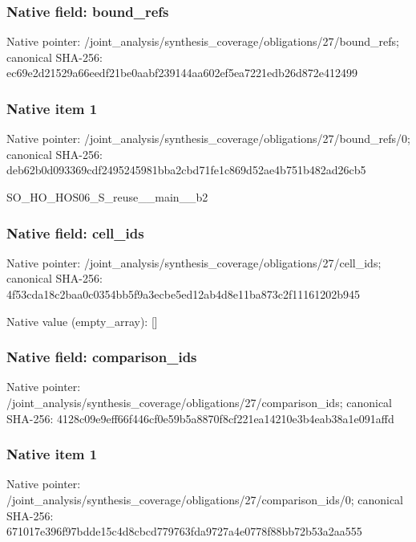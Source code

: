 \documentclass[10pt,a4paper]{article}
\begin{document}
\subsubsection{Native field: bound\_\allowbreak{}refs}
Native pointer: /joint\_\allowbreak{}analysis/synthesis\_\allowbreak{}coverage/obligations/27/bound\_\allowbreak{}refs; canonical SHA-256: ec69e2d21529a66eedf21be0aabf239144aa602ef5ea7221edb26d872e412499

\subsubsection{Native item 1}
Native pointer: /joint\_\allowbreak{}analysis/synthesis\_\allowbreak{}coverage/obligations/27/bound\_\allowbreak{}refs/0; canonical SHA-256: deb62b0d093369cdf2495245981bba2cbd71fe1c869d52ae4b751b482ad26cb5

\begingroup\raggedright\sloppy SO\_\allowbreak{}HO\_\allowbreak{}HOS06\_\allowbreak{}S\_\allowbreak{}reuse\_\allowbreak{}\_\allowbreak{}main\_\allowbreak{}\_\allowbreak{}b2\par\endgroup

\subsubsection{Native field: cell\_\allowbreak{}ids}
Native pointer: /joint\_\allowbreak{}analysis/synthesis\_\allowbreak{}coverage/obligations/27/cell\_\allowbreak{}ids; canonical SHA-256: 4f53cda18c2baa0c0354bb5f9a3ecbe5ed12ab4d8e11ba873c2f11161202b945

Native value (empty\_\allowbreak{}array): []

\subsubsection{Native field: comparison\_\allowbreak{}ids}
Native pointer: /joint\_\allowbreak{}analysis/synthesis\_\allowbreak{}coverage/obligations/27/comparison\_\allowbreak{}ids; canonical SHA-256: 4128c09e9eff66f446cf0e59b5a8870f8cf221ea14210e3b4eab38a1e091affd

\subsubsection{Native item 1}
Native pointer: /joint\_\allowbreak{}analysis/synthesis\_\allowbreak{}coverage/obligations/27/comparison\_\allowbreak{}ids/0; canonical SHA-256: 671017e396f97bdde15c4d8cbcd779763fda9727a4e0778f88bb72b53a2aa555
\end{document}
